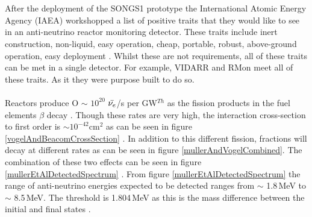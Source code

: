 \\\\After the deployment of the SONGS1 prototype the International Atomic Energy Agency (IAEA) workshopped a list of positive traits that they would like to see in an anti-neutrino reactor monitoring detector. These traits include inert construction, non-liquid, easy operation, cheap, portable, robust, above-ground operation, easy deployment \cite{IAEA_2008}. Whilst these are not requirements, all of these traits can be met in a single detector. For example, VIDARR and RMon meet all of these traits. As it they were purpose built to do so. 
\\\\Reactors produce O $\sim$ $10^{20}$ $\Bar{\nu_e}$/s per GW$^{Th}$ as the fission products in the fuel elements $\beta$ decay \cite{Mueller_2011}. Though these rates are very high, the interaction cross-section to first order is $\sim 10^{-42}$cm$^2$ as can be seen in figure \ref{vogelAndBeacomCrossSection} \cite{Vogel_1999}. In addition to this different fission, fractions will decay at different rates as can be seen in figure \ref{mullerAndVogelCombined}. The combination of these two effects can be seen in figure \ref{mullerEtAlDetectedSpectrum} \cite{Mueller_2011}. From figure \ref{mullerEtAlDetectedSpectrum} the range of anti-neutrino energies expected to be detected ranges from $\sim$ 1.8\,MeV to $\sim$ 8.5\,MeV. The threshold is 1.804\,MeV as this is the mass difference between the initial and final states \cite{Mueller_2011}.


